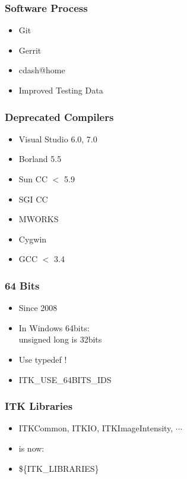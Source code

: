 





\begin{frame}
\frametitle{Software Process}
\Huge
\begin{itemize}
\item Git
\pause
\item Gerrit
\pause
\item cdash@home
\pause
\item Improved Testing Data
\end{itemize}
\end{frame}




\begin{frame}
\frametitle{Deprecated Compilers}
\Huge
\begin{itemize}
\item Visual Studio 6.0, 7.0
\pause
\item Borland 5.5
\pause
\item Sun CC $<$ 5.9
\pause
\item SGI CC
\pause
\item MWORKS
\pause
\item Cygwin
\pause
\item GCC $<$ 3.4
\end{itemize}
\end{frame}





\begin{frame}
\frametitle{64 Bits}
\Huge
\begin{itemize}
\item Since 2008
\pause
\item In Windows 64bits:\\unsigned long is 32bits
\pause
\item Use typedef !
\pause
\item ITK\_USE\_64BITS\_IDS
\end{itemize}
\end{frame}


\begin{frame}
\frametitle{ITK Libraries}
\Huge
\begin{itemize}
\item ITKCommon, ITKIO, ITKImageIntensity, $\cdots$
\pause
\item is now:
\pause
\item \$\{ITK\_LIBRARIES\}
\end{itemize}
\end{frame}


